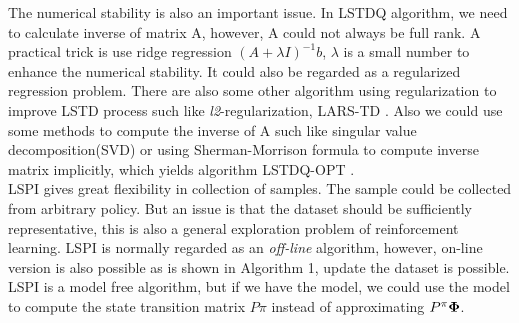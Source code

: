 The numerical stability is also an important issue. In LSTDQ algorithm, we need to calculate inverse of matrix A, however, A could not always be full rank. A practical trick is use ridge regression $(A + \lambda I)^{-1} b$, $\lambda$ is a small number to enhance the numerical stability. It could also be regarded as a regularized regression problem. There are also some other algorithm using regularization to improve LSTD process such like \textit{l2}-regularization, LARS-TD \cite{kolter2009regularization}\cite{petrik2010feature}. Also we could use some methods to compute the inverse of A such like singular value decomposition(SVD) or using Sherman-Morrison formula to compute inverse matrix implicitly, which yields algorithm LSTDQ-OPT \cite{lagoudakis2003least}.
\\
LSPI gives  great flexibility in collection of samples. The sample could be collected from arbitrary policy. But an issue is that the dataset should be sufficiently representative, this is also a general exploration problem of reinforcement learning. LSPI is normally regarded as an \textit{off-line} algorithm, however, on-line version is also possible \cite{li2009online}\cite{ma2010convergence} as is shown in Algorithm 1, update the dataset is possible. LSPI is a model free algorithm, but if we have the model, we could use the model to compute the state transition matrix $P\pi$ instead of approximating $P^\pi \vecPhi$. \\
